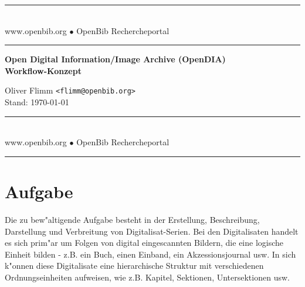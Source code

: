 \documentclass[11pt, twoside, a4paper, BCOR8mm, DIV12, bibtotoc,idxtotoc]{scrreprt}
\begin{document}
\begin{titlepage}

\begin{center}
\rule[-.1in]{16cm}{1mm}\\[3mm]
{\fontsize{20}{20pt}\selectfont
  www.openbib.org $\bullet$ OpenBib Rechercheportal}\\[-2mm]
\rule[-.1in]{16cm}{1mm}

\vspace{5cm}

  \textbf{\fontsize{30}{30pt}\selectfont Open Digital Information/Image Archive (OpenDIA)\\[3mm] Workflow-Konzept}

  \vspace{2cm}

  Oliver Flimm \texttt{<flimm@openbib.org>}\\
  Stand: \today

  \vspace{7cm}

\rule[-.1in]{16cm}{1mm}\\[3mm]
{\fontsize{20}{20pt}\selectfont
  www.openbib.org $\bullet$ OpenBib Rechercheportal}\\[-2mm]
\rule[-.1in]{16cm}{1mm}

\end{center}

\end{titlepage}






\tableofcontents

\chapter{Aufgabe}
Die zu bew"altigende Aufgabe besteht in der Erstellung, Beschreibung,
Darstellung und Ver\-brei\-tung von Digitalisat-Serien. Bei den
Digitalisaten handelt es sich prim"ar um Folgen von digital
ein\-ge\-scann\-ten Bildern, die eine logische Einheit bilden - z.B. ein
Buch, einen Einband, ein Akzessions\-jour\-nal usw. In sich k"onnen diese
Digitalisate eine hierarchische Struktur mit verschiedenen
Ord\-nungs\-einheiten aufweisen, wie z.B. Kapitel, Sektionen,
Untersektionen usw.
\end{document}
